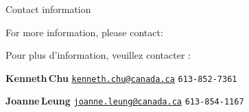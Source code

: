 

\begin{frame}{\vskip -0.1cm \huge Contact information}

\large

\begin{center}
\begin{multicols}{2}
	\begin{minipage}{4.0cm}
	\begin{center}
	For more information,
	\vskip -0.01cm
	\noindent
	please contact:
	\end{center}
	\end{minipage}
\columnbreak
	\begin{minipage}{4.5cm}
	\begin{center}
	Pour plus d'information,
	\vskip -0.01cm
	\noindent
	veuillez contacter :
	\end{center}
	\end{minipage}
\end{multicols}
\end{center}


\begin{center}
\vskip 0.5cm
\textbf{\huge Kenneth\;\,Chu}
\vskip 0.15cm
\href{mailto:kenneth.chu@canada.ca}{\Large\color{darkBlue}\underline{\texttt{kenneth.chu@canada.ca}}}
\vskip 0.24cm
\texttt{\Large 613-852-7361}
\end{center}

\begin{center}
\vskip 0.5cm
\textbf{\huge Joanne\;\,Leung}
\vskip 0.15cm
\href{mailto:joanne.leung@canada.ca}{\Large\color{darkBlue}\underline{\texttt{joanne.leung@canada.ca}}}
\vskip 0.24cm
\texttt{\Large 613-854-1167}
\end{center}

\end{frame}

%
%
%
%
